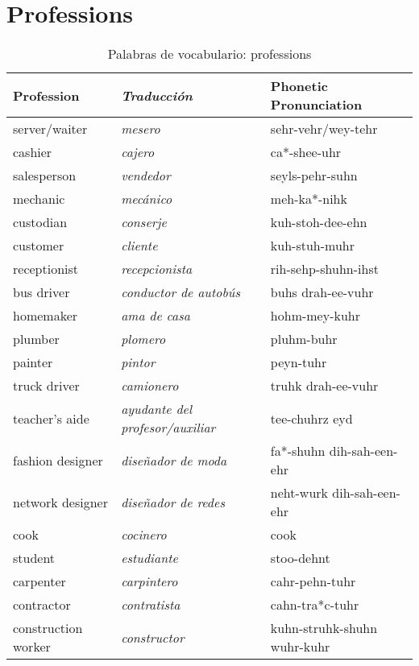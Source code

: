 \chapter{Professions}

\begin{table}[H]
	\centering
	\begin{tabular}{lll}
	\toprule
		\textbf{Profession} & \textbf{\emph{Traducci\'on}} & \textbf{Phonetic Pronunciation}\\
	\midrule
		server/waiter & \emph{mesero} & sehr-vehr/wey-tehr \\
		cashier & \emph{cajero} & ca*-shee-uhr \\
		salesperson & \emph{vendedor} & seyls-pehr-suhn \\
		mechanic & \emph{mecánico} & meh-ka*-nihk \\
		custodian & \emph{conserje} & kuh-stoh-dee-ehn \\
		customer & \emph{cliente} & kuh-stuh-muhr \\
		receptionist & \emph{recepcionista} & rih-sehp-shuhn-ihst \\
		bus driver & \emph{conductor de autobús} & buhs drah-ee-vuhr \\
		homemaker & \emph{ama de casa} & hohm-mey-kuhr \\
		plumber & \emph{plomero} & pluhm-buhr\\
		painter & \emph{pintor} & peyn-tuhr \\
		truck driver & \emph{camionero} & truhk drah-ee-vuhr \\
		teacher's aide & \emph{ayudante del profesor/auxiliar} & tee-chuhrz eyd \\
		fashion designer & \emph{diseñador de moda} & fa*-shuhn dih-sah-een-ehr \\
		network designer & \emph{diseñador de redes} & neht-wurk dih-sah-een-ehr \\
		cook & \emph{cocinero} & cook \\
		student & \emph{estudiante} & stoo-dehnt \\
		carpenter & \emph{carpintero} & cahr-pehn-tuhr \\
		contractor & \emph{contratista} & cahn-tra*c-tuhr \\
		construction worker & \emph{constructor} & kuhn-struhk-shuhn wuhr-kuhr \\
	\bottomrule
	\end{tabular}
	\caption{Palabras de vocabulario: professions}
\end{table}

